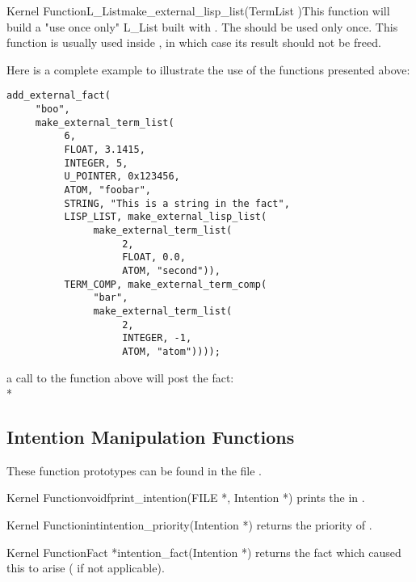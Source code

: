 \begin{typefn}{Kernel Function}{L\_List}{make\_external\_lisp\_list}{(TermList
)}This function will build a "use once only" L\_List built with
. The  should be used only once. This function
is usually used inside , in which case its
result should not be freed.
\end{typefn}

Here is a complete example to illustrate the use of the functions presented
above: 
\begin{verbatim}
add_external_fact(
     "boo", 
     make_external_term_list(
          6, 
          FLOAT, 3.1415, 
          INTEGER, 5,
          U_POINTER, 0x123456,
          ATOM, "foobar",
          STRING, "This is a string in the fact",
          LISP_LIST, make_external_lisp_list(
               make_external_term_list(
                    2, 
                    FLOAT, 0.0, 
                    ATOM, "second")),
          TERM_COMP, make_external_term_comp(
               "bar",
               make_external_term_list(
                    2,
                    INTEGER, -1,
                    ATOM, "atom"))));
\end{verbatim}

a call to the function above will post the fact:\\*


\subsection{Intention Manipulation Functions}

These function prototypes can be found in the file
.

\begin{typefn}{Kernel Function}{void}{fprint\_intention}{(FILE *,
Intention *)}
prints the  in .
\end{typefn}

\begin{typefn}{Kernel Function}{int}{intention\_priority}{(Intention
*)}
returns the priority of .
\end{typefn}

\begin{typefn}{Kernel Function}{Fact *}{intention\_fact}{(Intention
*)}
returns the fact which caused this  to arise
( if not applicable).
\end{typefn}

